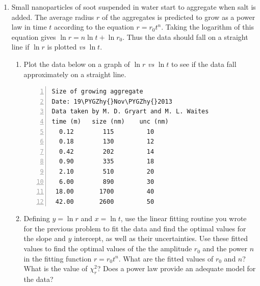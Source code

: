 \documentclass[letterpaper,10pt,english]{sphinxmanual}
\def\PYGZhy{\char`\-}
\begin{document}
\begin{enumerate}
\begin{enumerate}
\begin{Verbatim}[commandchars=\\\{\},numbers=left,firstnumber=1,stepnumber=1]
time (ns)   voltage (volts)  uncertainty (volts)
    0.0        5.08e+00        1.12e\PYGZhy{}01
   32.8        3.29e+00        9.04e\PYGZhy{}02
   65.6        2.23e+00        7.43e\PYGZhy{}02
   98.4        1.48e+00        6.05e\PYGZhy{}02
  131.2        1.11e+00        5.25e\PYGZhy{}02
  164.0        6.44e\PYGZhy{}01        4.00e\PYGZhy{}02
  196.8        4.76e\PYGZhy{}01        3.43e\PYGZhy{}02
  229.6        2.73e\PYGZhy{}01        2.60e\PYGZhy{}02
  262.4        1.88e\PYGZhy{}01        2.16e\PYGZhy{}02
  295.2        1.41e\PYGZhy{}01        1.87e\PYGZhy{}02
  328.0        9.42e\PYGZhy{}02        1.53e\PYGZhy{}02
  360.8        7.68e\PYGZhy{}02        1.38e\PYGZhy{}02
  393.6        3.22e\PYGZhy{}02        8.94e\PYGZhy{}03
  426.4        3.22e\PYGZhy{}02        8.94e\PYGZhy{}03
  459.2        1.98e\PYGZhy{}02        7.01e\PYGZhy{}03
  492.0        1.98e\PYGZhy{}02        7.01e\PYGZhy{}03
\end{Verbatim}

\end{enumerate}

\item {} 
Small nanoparticles of soot suspended in water start to aggregate when salt is added.  The average radius \(r\) of the aggregates is predicted to grow as a power law in time \(t\) according to the equation \(r = r_0t^n\).  Taking the logarithm of this equation gives \(\ln r = n\ln t + \ln r_0\).  Thus the data should fall on a straight line if \(\ln r\) is plotted \emph{vs} \(\ln t\).
\begin{enumerate}
\item {} 
Plot the data below on a graph of \(\ln r\) \emph{vs} \(\ln t\) to see if the data fall approximately on a straight line.

\begin{Verbatim}[commandchars=\\\{\},numbers=left,firstnumber=1,stepnumber=1]
Size of growing aggregate
Date: 19\PYGZhy{}Nov\PYGZhy{}2013
Data taken by M. D. Gryart and M. L. Waites
time (m)   size (nm)    unc (nm)
  0.12        115         10
  0.18        130         12
  0.42        202         14
  0.90        335         18
  2.10        510         20
  6.00        890         30
 18.00       1700         40
 42.00       2600         50
\end{Verbatim}

\item {} 
Defining \(y = \ln r\) and \(x = \ln t\), use the linear fitting routine you wrote for the previous problem to fit the data and find the optimal values for the slope and \(y\) intercept, as well as their uncertainties.  Use these fitted values to find the optimal values of the the amplitude \(r_0\) and the power \(n\) in the fitting function \(r = r_0t^n\).  What are the fitted values of \(r_0\) and \(n\)?  What is the value of \(\chi_r^2\)?  Does a power law provide an adequate model for the data?


\end{enumerate}
\end{enumerate}
\end{document}
